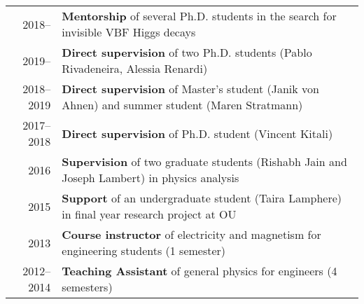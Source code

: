 \documentclass[a4paper,10pt]{article}
\begin{document}
\begin{tabular}{rp{15.5cm}}
\textsc{2018--\phantom{0000}} & {\bf Mentorship} of several Ph.D. students in the search for invisible VBF Higgs decays \\
\textsc{2019--\phantom{0000}} & {\bf Direct supervision} of two Ph.D. students (Pablo Rivadeneira, Alessia Renardi) \\
\textsc{2018--2019}           & {\bf Direct supervision} of Master's student (Janik von Ahnen) and summer student (Maren Stratmann)   \\
\textsc{2017--2018}           & {\bf Direct supervision} of Ph.D. student (Vincent Kitali)   \\
\textsc{2016}                 & {\bf Supervision} of two graduate students (Rishabh Jain and Joseph Lambert) in physics analysis  \\
\textsc{2015}                 & {\bf Support} of an undergraduate student (Taira Lamphere) in final year research project at OU \\
\textsc{2013}          & {\bf Course instructor} of electricity and magnetism for engineering students (1 semester)\\
\textsc{2012--2014}		      & {\bf Teaching Assistant} of general physics for engineers (4 semesters)\\
\end{tabular}

\vspace{3mm}
\end{document}
